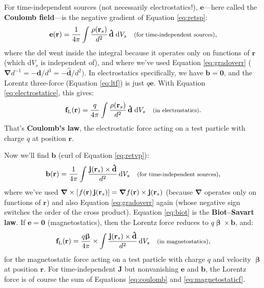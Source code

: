 \documentclass[12pt]{article}
\renewcommand{\vv}[1]{\mathbf{#1}}
\newcommand{\dd}[1]{\mathrm{d}#1}
\newcommand{\vvbeta}{\bm{\upbeta}}
\newcommand{\del}{\boldsymbol{\nabla}}
\begin{document}
For time-independent sources (not necessarily electrostatics!), $\vv e$---here called the \textbf{Coulomb field}---is the negative gradient of Equation \ref{eq:retsp}:
\begin{equation}\label{eq:electrostatice}
\vv e (\vv r) = \dfrac{1}{4 \pi} \int \dfrac{\rho ( \vv r _{s})}{d^2} \, \vv{\hat{d}} \; \dd V_{s} \quad \text{\footnotesize{(for time-independent sources)}},
\end{equation}
where the del went inside the integral because it operates only on functions of $\vv r$ (which $\dd V_{s}$ is independent of), and where we've used Equation \ref{eq:gradoverr} ($\del d^{-1} = - \vv d / d^3 = - \vv{\hat{d}}/d^2)$. In electrostatics specifically, we have $\vv b = \vv 0$, and the Lorentz three-force (Equation \ref{eq:ltf}) is just $q \vv e$. With Equation \ref{eq:electrostatice}, this gives:
\begin{equation}\label{eq:coulomb}
\vv f_{\textrm{L}} (\vv r) = \dfrac{q}{4 \pi} \int \dfrac{\rho ( \vv r _{s})}{d^2} \, \vv{\hat{d}} \; \dd V_{s}  \quad \text{\footnotesize{(in electrostatics)}}.
\end{equation}
That's \textbf{Coulomb's law}, the electrostatic force acting on a test particle with charge $q$ at position $\vv r$.

Now we'll find $\vv b$ (curl of Equation \ref{eq:retvp}):
\begin{equation}\label{eq:biot}
\vv b (\vv r) = \dfrac{1}{4 \pi} \int \dfrac{\vv j ( \vv r _{s}) \times \vv{\hat{d}}}{d^2} \, \dd V_{s} \quad \text{\footnotesize{(for time-independent sources)}},
\end{equation}
where we've used ${\del \times [ \mkern1mu f(\vv r) \, \vv j(\vv r_{s})] = \del f(\vv r) \times \vv j(\vv r_{s}) }$ (because $\del$ operates only on functions of $\vv r$) and also Equation \ref{eq:gradoverr} again (whose negative sign switches the order of the cross product). Equation \ref{eq:biot} is the \textbf{Biot--Savart law}. If $\vv e = \vv 0$ (magnetostatics), then the Lorentz force reduces to $q \vvbeta \times \vv b$, and:
\begin{equation}\label{eq:magnetostaticf}
\vv f_{\textrm{L}} (\vv r) = \dfrac{q \vvbeta}{4 \pi} \times \int \dfrac{\vv j ( \vv r _{s}) \times \vv{\hat{d}}}{d^2} \, \dd V_{s} \quad \text{\footnotesize{(in magnetostatics)}},
\end{equation}
for the magnetostatic force acting on a test particle with charge $q$ and velocity $\vvbeta$ at position $\vv r$. For time-independent $\vv J$ but nonvanishing $\vv e$ and $\vv b$, the Lorentz force is of course the sum of Equations \ref{eq:coulomb} and \ref{eq:magnetostaticf}.
\end{document}
